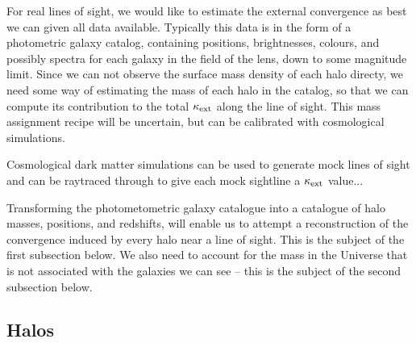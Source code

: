 \documentclass[useAMS,usenatbib]{mn2e}
\begin{document}
For real lines of sight, we would like to estimate the external convergence as best we can given all
data available. Typically this data is in the form of a photometric galaxy
catalog, containing positions, brightnesses, colours, and possibly spectra for each galaxy in the
field of the lens, down to some magnitude
limit. Since we can not observe the surface mass density of each halo
directy, we need some way of estimating
the mass of each halo in the catalog, so that we can compute its
contribution to the total $\kappa_{\rm ext}$ along the line of sight. This mass assignment recipe will be uncertain, but
can be calibrated with cosmological simulations.

%

Cosmological dark matter simulations can be used to generate mock lines of
sight and can be raytraced through to give each mock sightline a $\kappa_{\rm ext}$ value...


Transforming the photometometric galaxy catalogue into a  catalogue of
halo masses, positions, and redshifts, will enable us to attempt a
reconstruction of the convergence induced by every halo near a line of sight.
This is the subject of the first subsection below. We also need to account for
the mass in the Universe that is not associated with the galaxies we can see
-- this is the subject of the second subsection below. 



\subsection{Halos}
\end{document}
